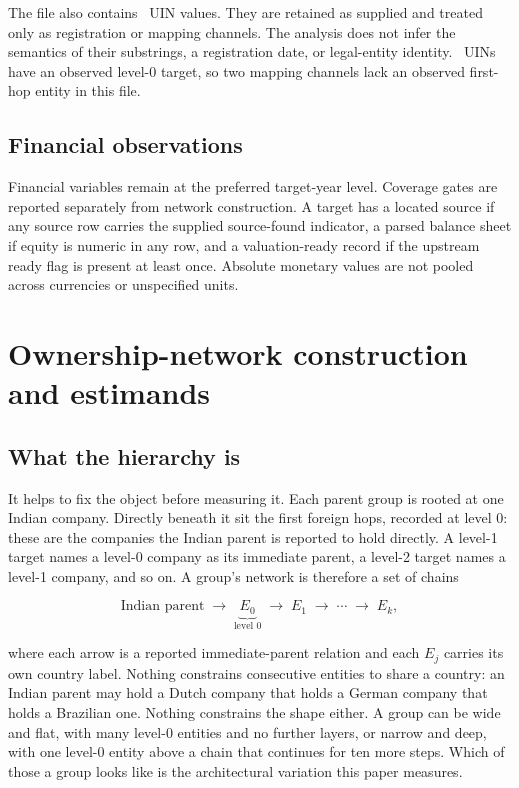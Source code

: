 \documentclass[11pt]{article}
\begin{document}
The file also contains \UINs\ UIN values. They are retained as supplied and
treated only as registration or mapping channels. The analysis does not infer
the semantics of their substrings, a registration date, or legal-entity
identity. \ObservedRoots\ UINs have an observed level-0 target, so two mapping
channels lack an observed first-hop entity in this file.

\subsection{Financial observations}

Financial variables remain at the preferred target-year level. Coverage gates
are reported separately from network construction. A target has a located
source if any source row carries the supplied source-found indicator, a parsed
balance sheet if equity is numeric in any row, and a valuation-ready record if
the upstream ready flag is present at least once. Absolute monetary values are
not pooled across currencies or unspecified units.

\section{Ownership-network construction and estimands}
\label{sec:methods}

\subsection{What the hierarchy is}

It helps to fix the object before measuring it. Each parent group is rooted at
one Indian company. Directly beneath it sit the first foreign hops, recorded at
level 0: these are the companies the Indian parent is reported to hold
directly. A level-1 target names a level-0 company as its immediate parent, a
level-2 target names a level-1 company, and so on. A group's network is
therefore a set of chains

\[
  \text{Indian parent} \;\rightarrow\; \underbrace{E_0}_{\text{level 0}}
  \;\rightarrow\; E_1 \;\rightarrow\; \cdots \;\rightarrow\; E_k ,
\]

where each arrow is a reported immediate-parent relation and each $E_j$ carries
its own country label. Nothing constrains consecutive entities to share a
country: an Indian parent may hold a Dutch company that holds a German company
that holds a Brazilian one. Nothing constrains the shape either. A group can be
wide and flat, with many level-0 entities and no further layers, or narrow and
deep, with one level-0 entity above a chain that continues for ten more steps.
Which of those a group looks like is the architectural variation this paper
measures.
\end{document}
